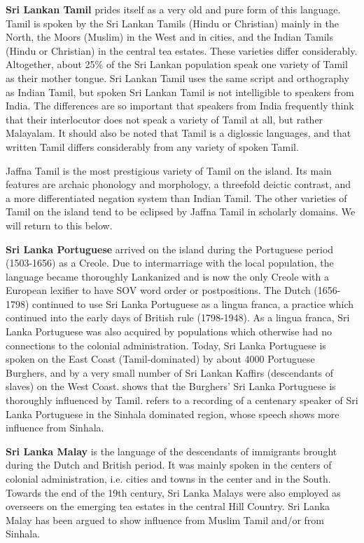 \documentclass[handout,utf8]{article}
\begin{document}
\textbf{Sri Lankan Tamil} prides itself as a very old and pure form of this language. Tamil is spoken by the Sri Lankan Tamils (Hindu or Christian) mainly in the North, the Moors (Muslim) in the West and in cities, and the Indian Tamils (Hindu or Christian) in the central tea estates. These varieties differ considerably. Altogether, about 25\% of the Sri Lankan population speak one variety of Tamil as their mother tongue. 
Sri Lankan Tamil uses the same script and orthography as Indian Tamil, but spoken Sri Lankan Tamil is not intelligible to speakers from India. The differences are so important that speakers from India frequently think that their interlocutor does not speak a variety of Tamil at all, but rather Malayalam. It should also be noted that Tamil is a diglossic languages, and that written Tamil differs considerably from any variety of spoken Tamil. 

Jaffna Tamil is the most prestigious variety of Tamil on the island. Its main features are archaic phonology and morphology, a threefold deictic contrast, and a more differentiated negation system than Indian Tamil. The other varieties of Tamil on the island tend to be eclipsed by Jaffna Tamil in scholarly domains. We will return to this below. 

\textbf{Sri Lanka Portuguese} arrived on the island during the Portuguese period (1503-1656) as a Creole. Due to intermarriage with the local population, the language became thoroughly Lankanized and is now the only Creole with a European lexifier to have SOV word order or postpositions. The Dutch (1656-1798) continued to use Sri Lanka Portuguese as a lingua franca, a practice which continued into the early days of British rule (1798-1948). As a lingua franca, Sri Lanka Portuguese was also acquired by populations which otherwise had no connections to the colonial administration. Today, Sri Lanka Portuguese is spoken on the East Coast (Tamil-dominated) by about 4000 Portuguese Burghers, and by a very small number of Sri Lankan Kaffirs (descendants of slaves) on the West Coast. \citet{Smith} shows that the Burghers' Sri Lanka Portuguese is thoroughly influenced by Tamil. \citet{Hettiaratchi} refers to a recording of a centenary speaker of Sri Lanka Portuguese in the Sinhala dominated region, whose speech shows 
more influence from Sinhala. 


\textbf{Sri Lanka Malay} is the language of the descendants of immigrants brought during the Dutch and British period. It was mainly spoken in the centers of colonial administration, i.e. cities and towns in the center and in the South. Towards the end of the 19th century, Sri Lanka Malays were also employed as overseers on the emerging tea estates in the central Hill Country. Sri Lanka Malay has been argued to show influence from Muslim Tamil and/or from Sinhala. 
\end{document}
